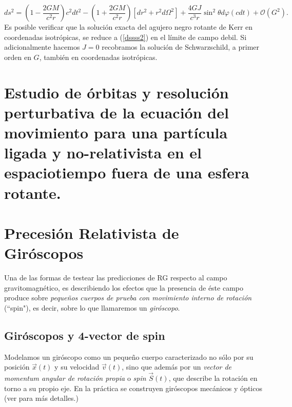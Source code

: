 \begin{equation}\boxed{
ds^2=\left(1-\frac{2GM}{c^2r}\right)c^2dt^2-\left(1+\frac{2GM}{c^2r}\right)\left[dr^2+r^2d\Omega^2\right]+\frac{4GJ}{c^3r}\sin^2 \theta d\varphi (cdt)+\mathcal{O}(G^2).}\label{dssss2}
\end{equation}
Es posible verificar que la solución exacta del agujero negro rotante de Kerr en coordenadas isotrópicas, se reduce a (\ref{dssss2}) en el límite de campo debil. Si adicionalmente hacemos $J=0$ recobramos la solución de Schwarzschild, a primer orden en $G$, también en coordenadas isotrópicas.

\section{Estudio de órbitas y resolución perturbativa de la ecuación del movimiento para una partícula ligada y no-relativista en el espaciotiempo fuera de una esfera rotante.}

\section{Precesión Relativista de Giróscopos}

Una de las formas de testear las predicciones de RG respecto al campo gravitomagnético, es describiendo los efectos que la presencia de éste campo produce sobre \textit{pequeños cuerpos de prueba con movimiento interno de rotación} (``spin"), es decir, sobre lo que llamaremos un \textit{giróscopo}.

\subsection{Giróscopos y 4-vector de spin}

Modelamos un giróscopo como un pequeño cuerpo caracterizado no sólo por %
su posición $\vec{x}(t)$ y su velocidad $\vec{v}(t)$, sino que además por un \textit{vector de momentum angular de rotación propia} o \textit{spin} $\vec{S}(t)$, que describe la rotación en torno a su propio eje. En la práctica se construyen giróscopos mecánicos y ópticos (ver \cite{1} para más detalles.)

